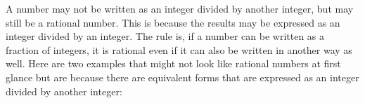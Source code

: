       \label{m38348*id62829}A number may not be written as an integer divided by another integer, but may still
be a rational number. This is because the results may be expressed
as an integer divided by an integer. The rule is, if a number can be written
as a fraction of integers, it is rational even if it can also be written in another
way as well. Here are two examples that might not look like rational numbers
at first glance but are because there are equivalent forms that are expressed as an
integer divided by another integer:\par 
      \label{m38348*uid8}\nopagebreak\noindent{}
\label{m38348*secfhsst!!!underscore!!!id232}
